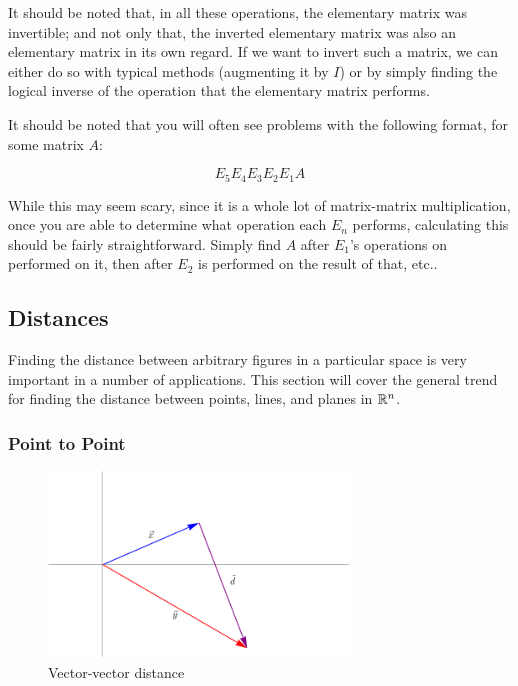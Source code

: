 \documentclass[12pt]{article}
\begin{document}
It should be noted that, in all these operations, the elementary matrix was invertible; and not only that, the inverted elementary matrix was also an elementary matrix in its own regard. If we want to invert such a matrix, we can either do so with typical methods (augmenting it by $I$) or by simply finding the logical inverse of the operation that the elementary matrix performs. 

It should be noted that you will often see problems with the following format, for some matrix $A$:

\begin{equation}
    E_5E_4E_3E_2E_1A
\end{equation}

While this may seem scary, since it is a whole lot of matrix-matrix multiplication, once you are able to determine what operation each $E_n$ performs, calculating this should be fairly straightforward. Simply find $A$ after $E_1$'s operations on performed on it, then after $E_2$ is performed on the result of that, etc..

\subsection{Distances}

Finding the distance between arbitrary figures in a particular space is very important in a number of applications. This section will cover the general trend for finding the distance between points, lines, and planes in $\mathbb{R}^{n}$.

\subsubsection{Point to Point}

\begin{figure}[!ht]
    \centering
    \includegraphics[width=8cm]{misc/vectordistance.png}
    \caption{Vector-vector distance}
    \label{fig:vectorvectordistances}
\end{figure}
\end{document}
